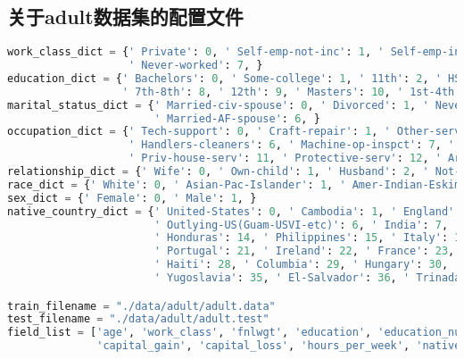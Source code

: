 \documentclass[withoutpreface,bwprint]{cumcmthesis}
\begin{document}
\begin{appendix}
\section{关于adult数据集的配置文件}
\begin{lstlisting}[language=python]
work_class_dict = {' Private': 0, ' Self-emp-not-inc': 1, ' Self-emp-inc': 2, ' Federal-gov': 3, ' Local-gov': 4, ' State-gov': 5, ' Without-pay': 6,
                   ' Never-worked': 7, }
education_dict = {' Bachelors': 0, ' Some-college': 1, ' 11th': 2, ' HS-grad': 3, ' Prof-school': 4, ' Assoc-acdm': 5, ' Assoc-voc': 6, ' 9th': 7,
                  ' 7th-8th': 8, ' 12th': 9, ' Masters': 10, ' 1st-4th': 11, ' 10th': 12, ' Doctorate': 13, ' 5th-6th': 14, ' Preschool': 15, }
marital_status_dict = {' Married-civ-spouse': 0, ' Divorced': 1, ' Never-married': 2, ' Separated': 3, ' Widowed': 4, ' Married-spouse-absent': 5,
                       ' Married-AF-spouse': 6, }
occupation_dict = {' Tech-support': 0, ' Craft-repair': 1, ' Other-service': 2, ' Sales': 3, ' Exec-managerial': 4, ' Prof-specialty': 5,
                   ' Handlers-cleaners': 6, ' Machine-op-inspct': 7, ' Adm-clerical': 8, ' Farming-fishing': 9, ' Transport-moving': 10,
                   ' Priv-house-serv': 11, ' Protective-serv': 12, ' Armed-Forces': 13, }
relationship_dict = {' Wife': 0, ' Own-child': 1, ' Husband': 2, ' Not-in-family': 3, ' Other-relative': 4, ' Unmarried': 5, }
race_dict = {' White': 0, ' Asian-Pac-Islander': 1, ' Amer-Indian-Eskimo': 2, ' Other': 3, ' Black': 4, }
sex_dict = {' Female': 0, ' Male': 1, }
native_country_dict = {' United-States': 0, ' Cambodia': 1, ' England': 2, ' Puerto-Rico': 3, ' Canada': 4, ' Germany': 5,
                       ' Outlying-US(Guam-USVI-etc)': 6, ' India': 7, ' Japan': 8, ' Greece': 9, ' South': 10, ' China': 11, ' Cuba': 12, ' Iran': 13,
                       ' Honduras': 14, ' Philippines': 15, ' Italy': 16, ' Poland': 17, ' Jamaica': 18, ' Vietnam': 19, ' Mexico': 20,
                       ' Portugal': 21, ' Ireland': 22, ' France': 23, ' Dominican-Republic': 24, ' Laos': 25, ' Ecuador': 26, ' Taiwan': 27,
                       ' Haiti': 28, ' Columbia': 29, ' Hungary': 30, ' Guatemala': 31, ' Nicaragua': 32, ' Scotland': 33, ' Thailand': 34,
                       ' Yugoslavia': 35, ' El-Salvador': 36, ' Trinadad&Tobago': 37, ' Peru': 38, ' Hong': 39, ' Holand-Netherlands': 40, }

train_filename = "./data/adult/adult.data"
test_filename = "./data/adult/adult.test"
field_list = ['age', 'work_class', 'fnlwgt', 'education', 'education_num', 'marital_status', 'occupation', 'relationship', 'race', 'sex',
              'capital_gain', 'capital_loss', 'hours_per_week', 'native_country']


\end{lstlisting}
\end{appendix}
\end{document}
